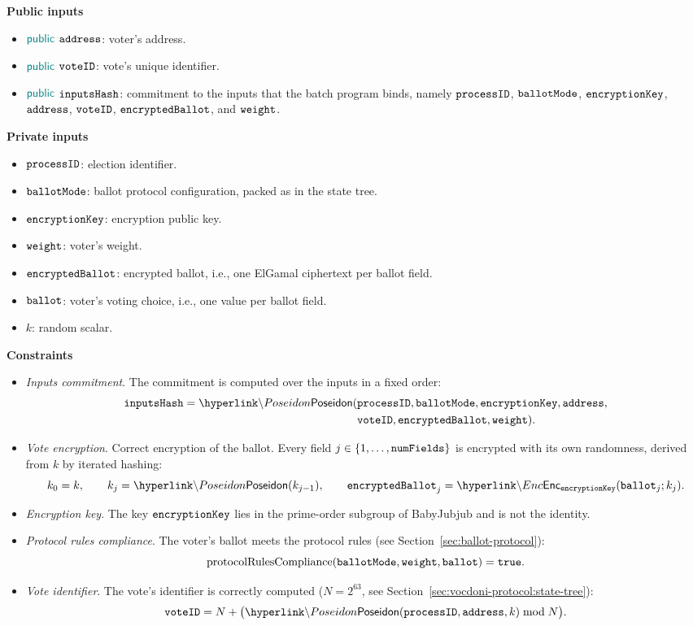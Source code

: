 	\vspace{0.3cm}
	\noi \textbf{Public inputs}
	\begin{itemize}
		\item ${\sf\color{teal}public}$ $\texttt{address}$: voter's address.
		\item ${\sf\color{teal}public}$ $\texttt{voteID}$: vote's unique identifier.
		\item ${\sf\color{teal}public}$ $\texttt{inputsHash}$: commitment to the inputs that the batch program binds, namely $\texttt{processID}$, $\texttt{ballotMode}$, $\texttt{encryptionKey}$, $\texttt{address}$, $\texttt{voteID}$, $\texttt{encryptedBallot}$, and $\texttt{weight}$.
	\end{itemize}
	\textbf{Private inputs}
	\begin{itemize}
		\item \private $\texttt{processID}$: election identifier.
		\item \private $\texttt{ballotMode}$: ballot protocol configuration, packed as in the state tree.
		\item \private $\texttt{encryptionKey}$: encryption public key.
		\item \private $\texttt{weight}$: voter's weight.
		\item \private $\texttt{encryptedBallot}$: encrypted ballot, i.e., one ElGamal ciphertext per ballot field.
		\item \private $\texttt{ballot}$: voter's voting choice, i.e., one value per ballot field.
		\item \private $k$: random scalar.
	\end{itemize}
	\textbf{Constraints}
	\begin{itemize}
		\item \emph{Inputs commitment}. The commitment is computed over the inputs in a fixed order:
		\begin{align*}\ballotinputshash = \hlget{\Poseidon}(&\processid, \ballotmode, \epk, \address,\\ &\voteid, \encryptedballot, \weight).\end{align*}
		\item \emph{Vote encryption}. Correct encryption of the ballot. Every field $j \in \{1,\dots,\texttt{numFields}\}$ is encrypted with its own randomness, derived from $k$ by iterated hashing:
		\[k_0 = k, \qquad k_j = \hlget{\Poseidon}(k_{j-1}), \qquad \encryptedballot_j = \hlget{\Enc}_{\epk}(\ballot_j; k_j).\]
		\item \emph{Encryption key}. The key $\texttt{encryptionKey}$ lies in the prime-order subgroup of BabyJubjub and is not the identity.
		\item \emph{Protocol rules compliance}. The voter's ballot meets the protocol rules (see Section~\ref{sec:ballot-protocol}):
		\[\text{protocolRulesCompliance}(\texttt{ballotMode}, \texttt{weight}, \texttt{ballot}) = \texttt{true}.\]
		\item \emph{Vote identifier}. The vote's identifier is correctly computed ($N = 2^{63}$, see Section~\ref{sec:vocdoni-protocol:state-tree}):
		\[\voteid = N + \bigl(\hlget{\Poseidon}(\processid,\address,k) \bmod N\bigr).\]
	\end{itemize}
	\vspace{-0.3cm}

